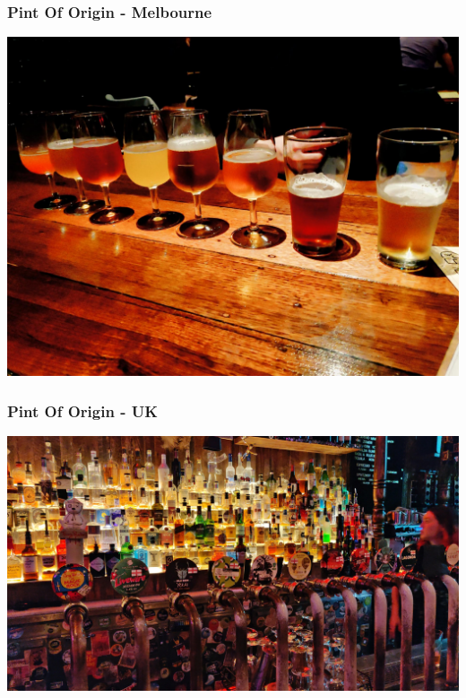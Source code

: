 \documentclass[12pt]{beamer}
\begin{document}
    \begin{frame}
        \frametitle{Pint Of Origin - Melbourne}
        \includegraphics[height=0.80\textheight,width=1\textwidth]{img/melbourne-poo.jpg}
    \end{frame}

    \begin{frame}
        \frametitle{Pint Of Origin - UK}
        \includegraphics[height=0.80\textheight,width=1\textwidth]{img/uk-poo.jpg}
    \end{frame}
\end{document}
